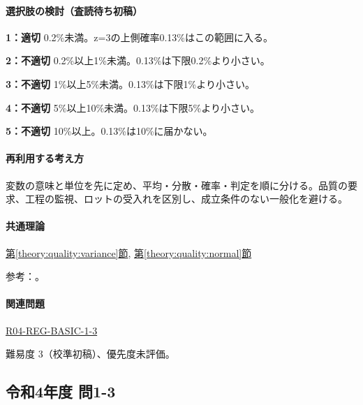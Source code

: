 \paragraph{選択肢の検討（査読待ち初稿）}\mbox{}\par

\noindent\textbf{1：適切} 0.2\%未満。z=\allowbreak{}3の上側確率0.13\%はこの範囲に入る。\par

\noindent\textbf{2：不適切} 0.2\%以上1\%未満。0.13\%は下限0.2\%より小さい。\par

\noindent\textbf{3：不適切} 1\%以上5\%未満。0.13\%は下限1\%より小さい。\par

\noindent\textbf{4：不適切} 5\%以上10\%未満。0.13\%は下限5\%より小さい。\par

\noindent\textbf{5：不適切} 10\%以上。0.13\%は10\%に届かない。\par

\paragraph{再利用する考え方} 変数の意味と単位を先に定め、平均・分散・確率・判定を順に分ける。品質の要求、工程の監視、ロットの受入れを区別し、成立条件のない一般化を避ける。

\paragraph{共通理論} \hyperref[theory:quality:variance]{第\ref*{theory:quality:variance}節}, \hyperref[theory:quality:normal]{第\ref*{theory:quality:normal}節}

\par 参考：\cite{stat_nist_normal,stat_psu_linear}。

\paragraph{関連問題} \hyperref[q:r04-reg-basic-1-3]{R04-REG-BASIC-1-3}

\par 難易度 3（校準初稿）、優先度未評価。

\subsection{令和4年度 問1-3}
\label{q:r04-reg-basic-1-3}

